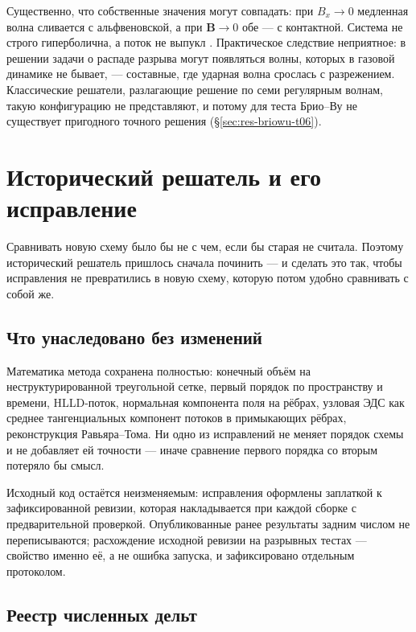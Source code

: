 \documentclass[12pt,a4paper]{article}
\newcommand{\B}{\mathbf{B}}
\begin{document}
Существенно, что собственные значения могут совпадать: при $B_x\to0$ медленная
волна сливается с альфвеновской, а при $\B\to0$ обе — с контактной. Система не
строго гиперболична, а поток не выпукл \cite{brio1988}. Практическое следствие
неприятное: в решении задачи о распаде разрыва могут появляться волны, которых в
газовой динамике не бывает, — составные, где ударная волна срослась с
разрежением. Классические решатели, разлагающие решение по семи регулярным
волнам, такую конфигурацию не представляют, и потому для теста Брио--Ву не
существует пригодного точного решения (\S\ref{sec:res-briowu-t06}).

\section{Исторический решатель и его исправление}
\label{sec:legacy}

Сравнивать новую схему было бы не с чем, если бы старая не считала. Поэтому
исторический решатель пришлось сначала починить --- и сделать это так, чтобы
исправления не превратились в новую схему, которую потом удобно сравнивать с
собой же.

\subsection{Что унаследовано без изменений}

Математика метода сохранена полностью: конечный объём на неструктурированной
треугольной сетке, первый порядок по пространству и времени, HLLD-поток,
нормальная компонента поля на рёбрах, узловая ЭДС как среднее тангенциальных
компонент потоков в примыкающих рёбрах, реконструкция Равьяра--Тома. Ни одно из
исправлений не меняет порядок схемы и не добавляет ей точности --- иначе
сравнение первого порядка со вторым потеряло бы смысл.

Исходный код остаётся неизменяемым: исправления оформлены заплаткой к
зафиксированной ревизии, которая накладывается при каждой сборке с
предварительной проверкой. Опубликованные ранее результаты задним числом не
переписываются; расхождение исходной ревизии на разрывных тестах --- свойство
именно её, а не ошибка запуска, и зафиксировано отдельным протоколом.

\subsection{Реестр численных дельт}
\end{document}
